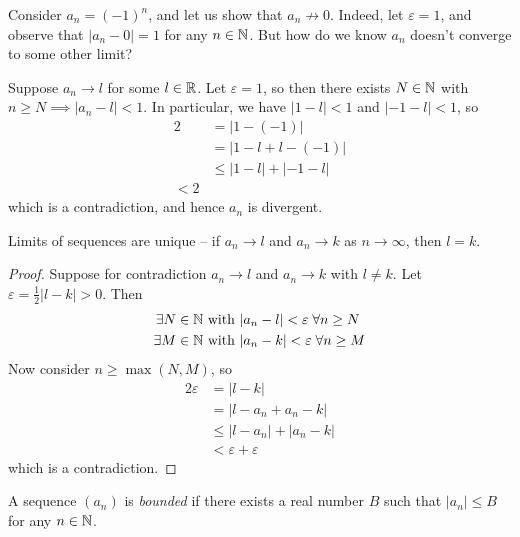 \documentclass{../../template/note}
\begin{document}
    \begin{example}
        Consider \(a_n = (-1)^n\), and let us show that \(a_n \not\to 0\). Indeed, let \(\varepsilon = 1\), and observe that \(|a_n - 0| = 1\) for any \(n \in \mathbb N\). But how do we know \(a_n\) doesn't converge to some other limit?

        Suppose \(a_n \to l\) for some \(l \in \mathbb R\). Let \(\varepsilon = 1\), so then there exists \(N \in \mathbb N\) with \(n \geq N \implies |a_n - l| < 1\). In particular, we have \(|1 - l| < 1\) and \(|-1 - l| < 1\), so
        \begin{align*}
            2 &= |1 - (-1)| \\
            &= |1 - l + l - (-1)| \\
            &\leq |1-l| + |-1-l| \\
            < 2
        \end{align*}
        which is a contradiction, and hence \(a_n\) is divergent.
    \end{example}
    
    \begin{proposition}
        Limits of sequences are unique -- if \(a_n \to l\) and \(a_n \to k\) as \(n \to \infty\), then \(l=k\).
    \end{proposition}
    
    \begin{proof}
        Suppose for contradiction \(a_n \to l\) and \(a_n \to k\) with \(l \neq k\). Let \(\varepsilon = \frac{1}{2}|l-k| > 0\). Then
        \begin{align*}
            \exists N \in \mathbb N \text{ with } &|a_n - l| < \varepsilon \; \forall n \geq N \\
            \exists M \in \mathbb N \text{ with } &|a_n - k| < \varepsilon \; \forall n \geq M
        \end{align*}
        Now consider \(n \geq \max(N, M)\), so
        \begin{align*}
            2\varepsilon &= |l-k| \\
            &= |l-a_n+a_n-k| \\
            &\leq |l-a_n|+|a_n-k| \\
            &< \varepsilon + \varepsilon
        \end{align*}
        which is a contradiction.
    \end{proof}
    
    \begin{definition}
        A sequence \((a_n)\) is \emph{bounded} if there exists a real number \(B\) such that \(|a_n| \leq B\) for any \(n \in \mathbb N\).
    \end{definition}
    
\end{document}
